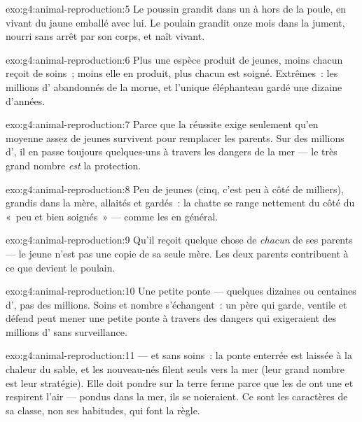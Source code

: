 \begin{solution}{exo:g4:animal-reproduction:5}
Le poussin grandit dans un  à  hors de la poule, en
vivant du jaune emballé avec lui. Le poulain grandit onze mois dans
la jument, nourri sans arrêt par son corps, et naît vivant.
\end{solution}

\begin{solution}{exo:g4:animal-reproduction:6}
Plus une espèce produit de jeunes, moins chacun reçoit de soins~;
moins elle en produit, plus chacun est soigné. Extrêmes~: les
millions d' abandonnés de la morue, et l'unique éléphanteau
gardé une dizaine d'années.
\end{solution}

\begin{solution}{exo:g4:animal-reproduction:7}
Parce que la réussite exige seulement qu'en moyenne assez de jeunes
survivent pour remplacer les parents. Sur des millions d', il en
passe toujours quelques-uns à travers les dangers de la mer --- le
très grand nombre \emph{est} la protection.
\end{solution}

\begin{solution}{exo:g4:animal-reproduction:8}
Peu de jeunes (cinq, c'est peu à côté de milliers), grandis dans la
mère, allaités et gardés~: la chatte se range nettement du côté du
«~peu et bien soignés~» --- comme les  en général.
\end{solution}

\begin{solution}{exo:g4:animal-reproduction:9}
Qu'il reçoit quelque chose de \emph{chacun} de ses parents --- le
jeune n'est pas une copie de sa seule mère. Les deux parents
contribuent à ce que devient le poulain.
\end{solution}

\begin{solution}{exo:g4:animal-reproduction:10}
Une petite ponte --- quelques dizaines ou centaines d', pas des
millions. Soins et nombre s'échangent~: un père qui garde, ventile
et défend peut mener une petite ponte à travers des dangers qui
exigeraient des millions d' sans surveillance.
\end{solution}

\begin{solution}{exo:g4:animal-reproduction:11}
 --- et sans soins~: la ponte enterrée est laissée à la
chaleur du sable, et les nouveau-nés filent seuls vers la mer (leur
grand nombre est leur stratégie). Elle doit pondre sur la terre
ferme parce que les  de  ont une  et respirent
l'air --- pondus dans la mer, ils se noieraient. Ce sont les
caractères de sa classe, non ses habitudes, qui font la règle.
\end{solution}
